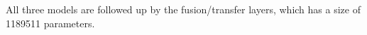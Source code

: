 All three models are followed up by the fusion/transfer layers, which has a size of 1189511 parameters.


